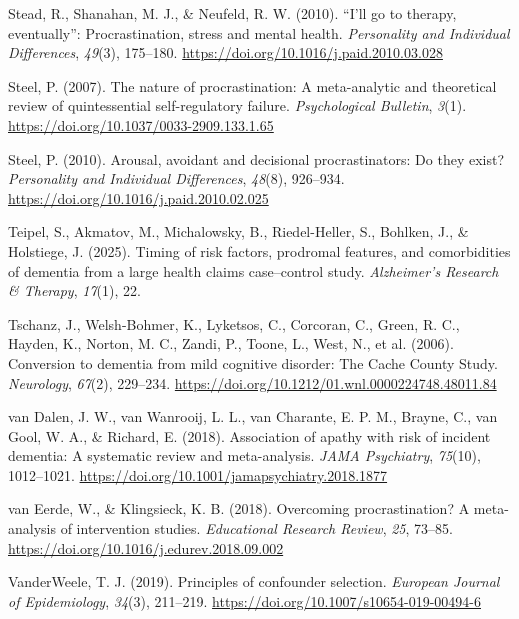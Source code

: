 \documentclass[
]{article}
\newlength{\cslhangindent}
\newenvironment{CSLReferences}[2] %
 {\begin{list}{}{%
  \setlength{\itemindent}{0pt}
  \setlength{\leftmargin}{0pt}
  \setlength{\parsep}{0pt}
  \ifodd #1
   \setlength{\leftmargin}{\cslhangindent}
   \setlength{\itemindent}{-1\cslhangindent}
  \fi
  \setlength{\itemsep}{#2\baselineskip}}}
 {\end{list}}
\begin{document}
\begin{CSLReferences}{1}{0}
Stead, R., Shanahan, M. J., \& Neufeld, R. W. (2010). {``{I}'ll go to
therapy, eventually''}: {Procrastination}, stress and mental health.
\emph{Personality and Individual Differences}, \emph{49}(3), 175--180.
\url{https://doi.org/10.1016/j.paid.2010.03.028}

Steel, P. (2007). The nature of procrastination: A meta-analytic and
theoretical review of quintessential self-regulatory failure.
\emph{Psychological Bulletin}, \emph{3}(1).
\url{https://doi.org/10.1037/0033-2909.133.1.65}

Steel, P. (2010). Arousal, avoidant and decisional procrastinators: {Do}
they exist? \emph{Personality and Individual Differences}, \emph{48}(8),
926--934. \url{https://doi.org/10.1016/j.paid.2010.02.025}

Teipel, S., Akmatov, M., Michalowsky, B., Riedel-Heller, S., Bohlken,
J., \& Holstiege, J. (2025). Timing of risk factors, prodromal features,
and comorbidities of dementia from a large health claims case--control
study. \emph{Alzheimer's Research \& Therapy}, \emph{17}(1), 22.

Tschanz, J., Welsh-Bohmer, K., Lyketsos, C., Corcoran, C., Green, R. C.,
Hayden, K., Norton, M. C., Zandi, P., Toone, L., West, N., et al.
(2006). Conversion to dementia from mild cognitive disorder: The {Cache
County Study}. \emph{Neurology}, \emph{67}(2), 229--234.
\url{https://doi.org/10.1212/01.wnl.0000224748.48011.84}

van Dalen, J. W., van Wanrooij, L. L., van Charante, E. P. M., Brayne,
C., van Gool, W. A., \& Richard, E. (2018). Association of apathy with
risk of incident dementia: A systematic review and meta-analysis.
\emph{JAMA Psychiatry}, \emph{75}(10), 1012--1021.
\url{https://doi.org/10.1001/jamapsychiatry.2018.1877}

van Eerde, W., \& Klingsieck, K. B. (2018). Overcoming procrastination?
{A} meta-analysis of intervention studies. \emph{Educational Research
Review}, \emph{25}, 73--85.
\url{https://doi.org/10.1016/j.edurev.2018.09.002}

VanderWeele, T. J. (2019). Principles of confounder selection.
\emph{European Journal of Epidemiology}, \emph{34}(3), 211--219.
\url{https://doi.org/10.1007/s10654-019-00494-6}


\end{CSLReferences}
\end{document}
